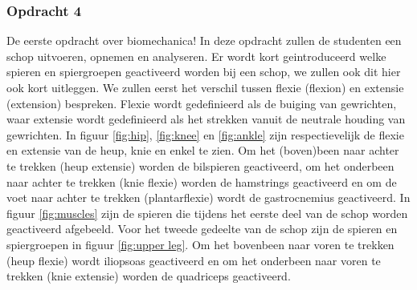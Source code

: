 \documentclass{article}
\begin{document}
\subsubsection{Opdracht 4}
De eerste opdracht over biomechanica! In deze opdracht zullen de studenten een schop uitvoeren, opnemen en analyseren. Er wordt kort geintroduceerd welke spieren en spiergroepen geactiveerd worden bij een schop, we zullen ook dit hier ook kort uitleggen. We zullen eerst het verschil tussen flexie (flexion) en extensie (extension) bespreken. Flexie wordt gedefinieerd als de buiging van gewrichten, waar extensie wordt gedefinieerd als het strekken vanuit de neutrale houding van gewrichten. In figuur \ref{fig:hip}, \ref{fig:knee} en \ref{fig:ankle} zijn respectievelijk de flexie en extensie van de heup, knie en enkel te zien. Om het (boven)been naar achter te trekken (heup extensie) worden de bilspieren geactiveerd, om het onderbeen naar achter te trekken (knie flexie) worden de hamstrings geactiveerd en om de voet naar achter te trekken (plantarflexie) wordt de gastrocnemius geactiveerd. In figuur \ref{fig:muscles} zijn de spieren die tijdens het eerste deel van de schop worden geactiveerd afgebeeld. Voor het tweede gedeelte van de schop zijn de spieren en spiergroepen in figuur \ref{fig:upper leg}. Om het bovenbeen naar voren te trekken (heup flexie) wordt iliopsoas geactiveerd en om het onderbeen naar voren te trekken (knie extensie) worden de quadriceps geactiveerd. \\\\
\end{document}
